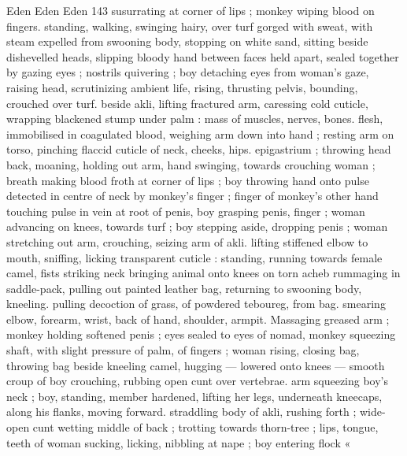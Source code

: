 Eden Eden Eden 143
susurrating at corner of lips ; monkey wiping blood on fingers.
standing, walking, swinging hairy, over turf gorged with sweat, with
steam expelled from swooning body, stopping on white sand, sitting
beside dishevelled heads, slipping bloody hand between faces held
apart, sealed together by gazing eyes ; nostrils quivering ; boy
detaching eyes from woman's gaze, raising head, scrutinizing
ambient life, rising, thrusting pelvis, bounding, crouched over turf.
beside akli, lifting fractured arm, caressing cold cuticle, wrapping
blackened stump under palm : mass of muscles, nerves, bones.
flesh, immobilised in coagulated blood, weighing arm down into hand
; resting arm on torso, pinching flaccid cuticle of neck, cheeks, hips.
epigastrium ; throwing head back, moaning, holding out arm, hand
swinging, towards crouching woman ; breath making blood froth at
corner of lips ; boy throwing hand onto pulse detected in centre of
neck by monkey's finger ; finger of monkey's other hand touching
pulse in vein at root of penis, boy grasping penis, finger ; woman
advancing on knees, towards turf ; boy stepping aside, dropping
penis ; woman stretching out arm, crouching, seizing arm of akli.
lifting stiffened elbow to mouth, sniffing, licking transparent cuticle :
standing, running towards female camel, fists striking neck bringing
animal onto knees on torn acheb rummaging in saddle-pack, pulling
out painted leather bag, returning to swooning body, kneeling.
pulling decoction of grass, of powdered teboureg, from bag.
smearing elbow, forearm, wrist, back of hand, shoulder, armpit.
Massaging greased arm ; monkey holding softened penis ; eyes
sealed to eyes of nomad, monkey squeezing shaft, with slight
pressure of palm, of fingers ; woman rising, closing bag, throwing
bag beside kneeling camel, hugging — lowered onto knees —
smooth croup of boy crouching, rubbing open cunt over vertebrae.
arm squeezing boy’s neck ; boy, standing, member hardened, lifting
her legs, underneath kneecaps, along his flanks, moving forward.
straddling body of akli, rushing forth ; wide-open cunt wetting
middle of back ; trotting towards thorn-tree ; lips, tongue, teeth of
woman sucking, licking, nibbling at nape ; boy entering flock «

